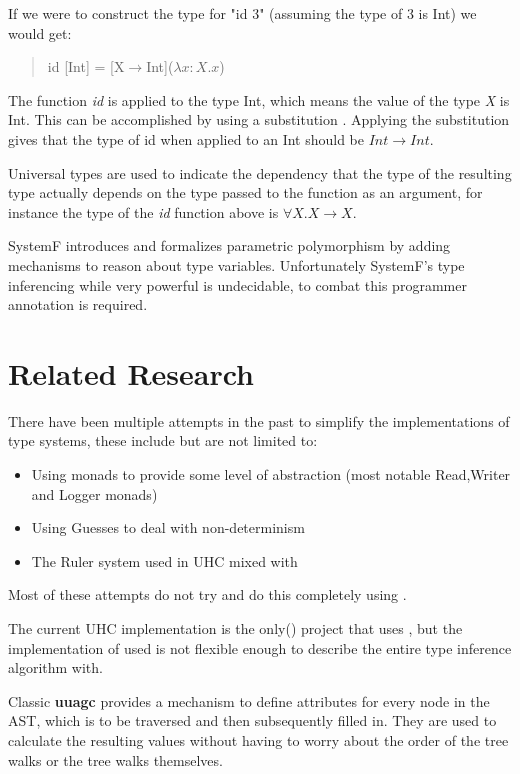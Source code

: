 If we were to construct the type for "id 3" (assuming the type of 3 is Int) we would get:

\begin{quotation}
id [Int] = [X$\rightarrow$Int]($\lambda x:X. x$)
\end{quotation}

The function \emph{id} is applied to the type Int, which means the value of the type \emph{X} is Int. This can be accomplished by using a substitution . Applying the substitution gives that the type of id when applied to an Int should be $Int \rightarrow Int$.

Universal types are used to indicate the dependency that the type of the resulting type actually depends on the type passed to the function as an argument, for instance the type of the \textit{id} function above is $\forall X. X\rightarrow X$.

SystemF introduces and formalizes parametric polymorphism by adding mechanisms to reason about type variables. Unfortunately SystemF's type inferencing while very powerful is undecidable, to combat this programmer annotation is required.

\section{Related Research}
There have been multiple attempts in the past to simplify the implementations of type systems, these include but are not limited to:

\begin{itemize}
\item Using monads\cite{Monads} to provide some level of abstraction (most notable Read,Writer and Logger monads)
\item Using Guesses\cite{Guesses} to deal with non-determinism 
\item The Ruler\cite{Ruler} system used in UHC mixed with \ags
\end{itemize}

Most of these attempts do not try and do this completely using \ags.

The current UHC implementation is the only(\cite{UHC}) project that uses \ags, but the implementation of \ags used is not flexible enough to describe the entire type inference algorithm with.

Classic \textbf{uuagc} provides a mechanism to define attributes for every node in the AST, which is to be traversed and then subsequently filled in. They are used to calculate the resulting values without having to worry about the order of the tree walks or the tree walks themselves.

